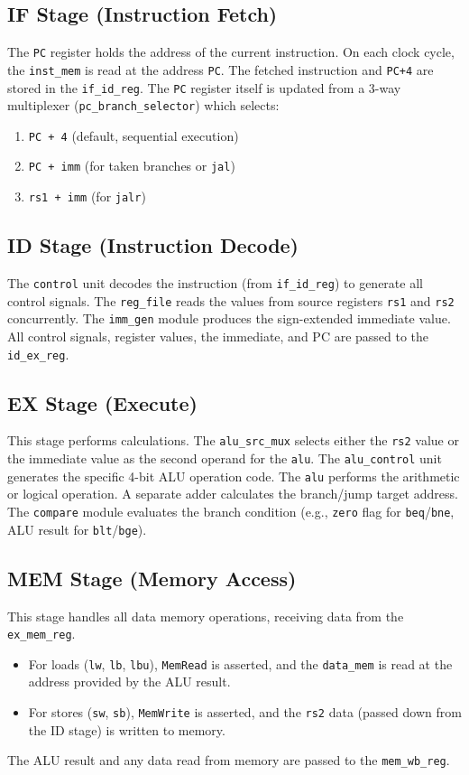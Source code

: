 \documentclass{article}
\begin{document}
\subsection{IF Stage (Instruction Fetch)}
The \texttt{PC} register holds the address of the current instruction. On each clock cycle, the \texttt{inst\_mem} is read at the address \texttt{PC}. The fetched instruction and \texttt{PC+4} are stored in the \texttt{if\_id\_reg}. The \texttt{PC} register itself is updated from a 3-way multiplexer (\texttt{pc\_branch\_selector}) which selects:
\begin{enumerate}
    \item \texttt{PC + 4} (default, sequential execution)
    \item \texttt{PC + imm} (for taken branches or \texttt{jal})
    \item \texttt{rs1 + imm} (for \texttt{jalr})
\end{enumerate}

\subsection{ID Stage (Instruction Decode)}
The \texttt{control} unit decodes the instruction (from \texttt{if\_id\_reg}) to generate all control signals. The \texttt{reg\_file} reads the values from source registers \texttt{rs1} and \texttt{rs2} concurrently. The \texttt{imm\_gen} module produces the sign-extended immediate value. All control signals, register values, the immediate, and PC are passed to the \texttt{id\_ex\_reg}.

\subsection{EX Stage (Execute)}
This stage performs calculations. The \texttt{alu\_src\_mux} selects either the \texttt{rs2} value or the immediate value as the second operand for the \texttt{alu}. The \texttt{alu\_control} unit generates the specific 4-bit ALU operation code. The \texttt{alu} performs the arithmetic or logical operation. A separate adder calculates the branch/jump target address. The \texttt{compare} module evaluates the branch condition (e.g., \texttt{zero} flag for \texttt{beq}/\texttt{bne}, ALU result for \texttt{blt}/\texttt{bge}).

\subsection{MEM Stage (Memory Access)}
This stage handles all data memory operations, receiving data from the \texttt{ex\_mem\_reg}.
\begin{itemize}
    \item For loads (\texttt{lw}, \texttt{lb}, \texttt{lbu}), \texttt{MemRead} is asserted, and the \texttt{data\_mem} is read at the address provided by the ALU result.
    \item For stores (\texttt{sw}, \texttt{sb}), \texttt{MemWrite} is asserted, and the \texttt{rs2} data (passed down from the ID stage) is written to memory.
\end{itemize}
The ALU result and any data read from memory are passed to the \texttt{mem\_wb\_reg}.
\end{document}
